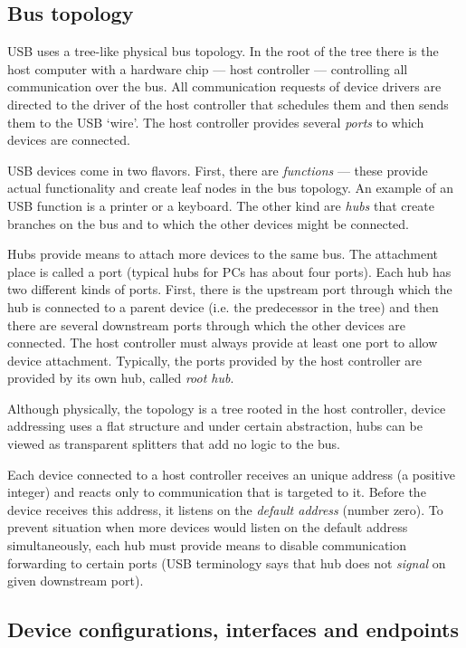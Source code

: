 \subsection{Bus topology}

USB uses a tree-like physical bus topology. In the root of the tree there is
the host computer with a hardware chip — host controller — controlling all
communication over the bus. All communication requests of device drivers are
directed to the driver of the host controller that schedules them and then
sends them to the USB ‘wire’. The host controller provides several
\textit{ports} to which devices are connected.

USB devices come in two flavors. First, there are \textit{functions} — these
provide actual functionality and create leaf nodes in the bus topology. An
example of an USB function is a printer or a keyboard. The other kind are
\textit{hubs} that create branches on the bus and to which the other devices
might be connected.

Hubs provide means to attach more devices to the same bus. The attachment place
is called a port (typical hubs for PCs has about four ports). Each hub has two
different kinds of ports. First, there is the upstream port through which the
hub is connected to a parent device (i.e. the predecessor in the tree) and then
there are several downstream ports through which the other devices are
connected. The host controller must always provide at least one port to allow
device attachment. Typically, the ports provided by the host controller are
provided by its own hub, called \textit{root hub}.

Although physically, the topology is a tree rooted in the host controller,
device addressing uses a flat structure and under certain abstraction, hubs can
be viewed as transparent splitters that add no logic to the bus.

Each device connected to a host controller receives an unique address (a
positive integer) and reacts only to communication that is targeted to it.
Before the device receives this address, it listens on the \textit{default
address} (number zero). To prevent situation when more devices would listen on
the default address simultaneously, each hub must provide means to disable
communication forwarding to certain ports (USB terminology says that hub does
not \textit{signal} on given downstream port).

\subsection{Device configurations, interfaces and endpoints}

